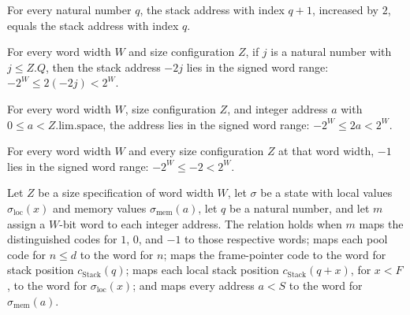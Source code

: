 \begin{theorem}
\label{Light.Compiler.cStack_succ_add}
\leanok
{}
For every natural number $q$, the stack address with index $q+1$, increased by $2$,
equals the stack address with index $q$.
\end{theorem}

\begin{theorem}
\label{Light.Compiler.Sizes.inRange_stack}
\leanok
{}
For every word width $W$ and size configuration $Z$, if $j$ is a natural number with
$j\le Z.Q$, then the stack address $-2j$ lies in the signed word range: $-2^W\le
2(-2j)<2^W$.
\end{theorem}

\begin{theorem}
\label{Light.Compiler.Sizes.inRange_addr}
\leanok
{}
For every word width $W$, size configuration $Z$, and integer address $a$ with $0\le
a<Z.\mathrm{lim}.\mathrm{space}$, the address lies in the signed word range: $-2^W\le
2a<2^W$.
\end{theorem}

\begin{theorem}
\label{Light.Compiler.Sizes.inRange_neg_one}
\leanok
{}
For every word width $W$ and every size configuration $Z$ at that word width, $-1$ lies
in the signed word range: $-2^W\le -2<2^W$.
\end{theorem}

\begin{definition}
\label{Light.Compiler.Rel}
\leanok
{}
Let $Z$ be a size specification of word width $W$, let $\sigma$ be a state with local
values $\sigma_{\mathrm{loc}}(x)$ and memory values $\sigma_{\mathrm{mem}}(a)$, let $q$
be a natural number, and let $m$ assign a $W$-bit word to each integer address. The
relation holds when $m$ maps the distinguished codes for $1$, $0$, and $-1$ to those
respective words; maps each pool code for $n\le d$ to the word for $n$; maps the
frame-pointer code to the word for stack position $c_{\mathrm{Stack}}(q)$; maps each
local stack position $c_{\mathrm{Stack}}(q+x)$, for $x<F$, to the word for
$\sigma_{\mathrm{loc}}(x)$; and maps every address $a<S$ to the word for
$\sigma_{\mathrm{mem}}(a)$.
\end{definition}

